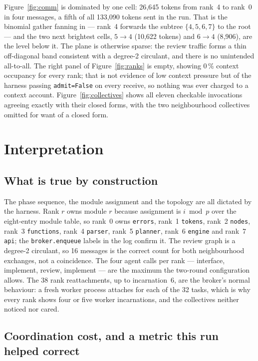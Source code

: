 \documentclass[11pt]{article}
\begin{document}
Figure~\ref{fig:comm} is dominated by one cell: 26{,}645 tokens from rank~4 to rank~0 in four
messages, a fifth of all 133{,}090 tokens sent in the run. That is the binomial gather
fanning in --- rank~4 forwards the subtree $\{4,5,6,7\}$ to the root --- and the two next
brightest cells, $5\rightarrow4$ (10{,}622 tokens) and $6\rightarrow4$ (8{,}906), are the
level below it. The plane is otherwise sparse: the review traffic forms a thin off-diagonal
band consistent with a degree-2 circulant, and there is no unintended all-to-all. The right
panel of Figure~\ref{fig:ranks} is empty, showing 0\,\% context occupancy for every rank;
that is not evidence of low context pressure but of the harness passing \texttt{admit=False}
on every receive, so nothing was ever charged to a context account. Figure~\ref{fig:collectives}
shows all eleven checkable invocations agreeing exactly with their closed forms, with the two
neighbourhood collectives omitted for want of a closed form.

\section{Interpretation}

\subsection*{What is true by construction}

The phase sequence, the module assignment and the topology are all dictated by the harness.
Rank $r$ owns module $r$ because assignment is $i \bmod p$ over the eight-entry module table,
so rank~0 owns \texttt{errors}, rank~1 \texttt{tokens}, rank~2 \texttt{nodes}, rank~3
\texttt{functions}, rank~4 \texttt{parser}, rank~5 \texttt{planner}, rank~6 \texttt{engine} and
rank~7 \texttt{api}; the \texttt{broker.enqueue} labels in the log confirm it. The review graph
is a degree-2 circulant, so 16 messages is the correct count for both neighbourhood exchanges,
not a coincidence. The four agent calls per rank --- interface, implement, review, implement ---
are the maximum the two-round configuration allows. The 38 rank reattachments, up to
incarnation~6, are the broker's normal behaviour: a fresh worker process attaches for each of
the 32 tasks, which is why every rank shows four or five worker incarnations, and the
collectives neither noticed nor cared.

\subsection*{Coordination cost, and a metric this run helped correct}
\end{document}
